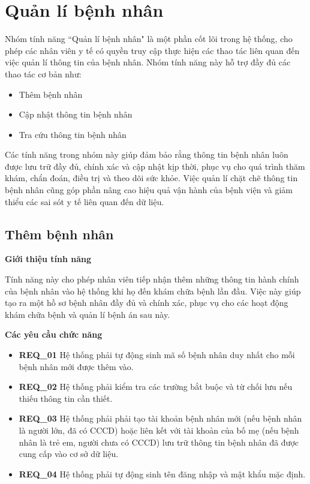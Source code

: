 \section{Quản lí bệnh nhân}

Nhóm tính năng ``Quản lí bệnh nhân" là một phần cốt lõi trong hệ thống, cho phép các nhân viên y tế có quyền truy cập thực hiện các thao tác liên quan đến việc quản lí thông tin của bệnh nhân. Nhóm tính năng này hỗ trợ đầy đủ các thao tác cơ bản như:
\begin{itemize}
  \item Thêm bệnh nhân
  \item Cập nhật thông tin bệnh nhân
  \item Tra cứu thông tin bệnh nhân
\end{itemize}

Các tính năng trong nhóm này giúp đảm bảo rằng thông tin bệnh nhân luôn được lưu trữ đầy đủ, chính xác và cập nhật kịp thời, phục vụ cho quá trình thăm khám, chẩn đoán, điều trị và theo dõi sức khỏe. Việc quản lí chặt chẽ thông tin bệnh nhân cũng góp phần nâng cao hiệu quả vận hành của bệnh viện và giảm thiểu các sai sót y tế liên quan đến dữ liệu.

\subsection{Thêm bệnh nhân}

\noindent \textbf{Giới thiệu tính năng}

Tính năng này cho phép nhân viên tiếp nhận thêm những thông tin hành chính của bệnh nhân vào hệ thống khi họ đến khám chữa bệnh lần đầu. Việc này giúp tạo ra một hồ sơ bệnh nhân đầy đủ và chính xác, phục vụ cho các hoạt động khám chữa bệnh và quản lí bệnh án sau này.

\noindent \textbf{Các yêu cầu chức năng}

\begin{itemize}
  \item \textbf{REQ\_01} Hệ thống phải tự động sinh mã số bệnh nhân duy nhất cho mỗi bệnh nhân mới được thêm vào.
  \item \textbf{REQ\_02} Hệ thống phải kiểm tra các trường bắt buộc và từ chối lưu nếu thiếu thông tin cần thiết.
  \item \textbf{REQ\_03} Hệ thống phải phải tạo tài khoản bệnh nhân mới (nếu bệnh nhân là người lớn, đã có CCCD) hoặc liên kết với tài khoản của bố mẹ (nếu bệnh nhân là trẻ em, người chưa có CCCD) lưu trữ thông tin bệnh nhân đã được cung cấp vào cơ sở dữ liệu.
  \item \textbf{REQ\_04} Hệ thống phải tự động sinh tên đăng nhập và mật khẩu mặc định.
\end{itemize}

